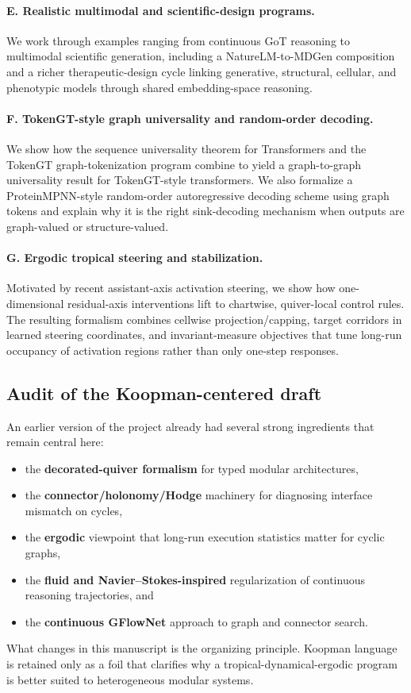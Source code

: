 \documentclass[11pt]{article}
\theoremstyle{definition}
\theoremstyle{plain}
\theoremstyle{remark}
\begin{document}
\paragraph{E. Realistic multimodal and scientific-design programs.}
We work through examples ranging from continuous GoT reasoning to multimodal scientific generation, including a NatureLM-to-MDGen composition and a richer therapeutic-design cycle linking generative, structural, cellular, and phenotypic models through shared embedding-space reasoning.

\paragraph{F. TokenGT-style graph universality and random-order decoding.}
We show how the sequence universality theorem for Transformers and the TokenGT graph-tokenization program combine to yield a graph-to-graph universality result for TokenGT-style transformers.
We also formalize a ProteinMPNN-style random-order autoregressive decoding scheme using graph tokens and explain why it is the right sink-decoding mechanism when outputs are graph-valued or structure-valued.

\paragraph{G. Ergodic tropical steering and stabilization.}
Motivated by recent assistant-axis activation steering, we show how one-dimensional residual-axis interventions lift to chartwise, quiver-local control rules.
The resulting formalism combines cellwise projection/capping, target corridors in learned steering coordinates, and invariant-measure objectives that tune long-run occupancy of activation regions rather than only one-step responses.

\subsection{Audit of the Koopman-centered draft}
\label{sec:audit}

An earlier version of the project already had several strong ingredients that remain central here:
\begin{itemize}[leftmargin=2em]
\item the \textbf{decorated-quiver formalism} for typed modular architectures,
\item the \textbf{connector/holonomy/Hodge} machinery for diagnosing interface mismatch on cycles,
\item the \textbf{ergodic} viewpoint that long-run execution statistics matter for cyclic graphs,
\item the \textbf{fluid and Navier--Stokes-inspired} regularization of continuous reasoning trajectories, and
\item the \textbf{continuous GFlowNet} approach to graph and connector search.
\end{itemize}
What changes in this manuscript is the organizing principle.
Koopman language is retained only as a foil that clarifies why a tropical-dynamical-ergodic program is better suited to heterogeneous modular systems.
\end{document}
